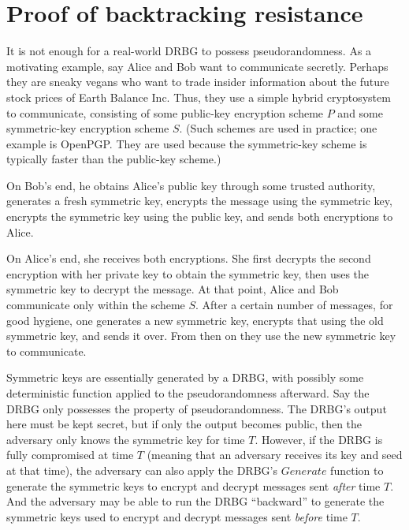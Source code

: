 \documentclass[12pt,lot, lof]{puthesis}
\begin{document}
{%



\section{Proof of backtracking resistance}

It is not enough for a real-world DRBG to possess pseudorandomness. As a motivating example, say Alice and Bob want to communicate secretly. Perhaps they are sneaky vegans who want to trade insider information about the future stock prices of Earth Balance Inc. Thus, they use a simple hybrid cryptosystem to communicate, consisting of some public-key encryption scheme $P$ and some symmetric-key encryption scheme $S$. (Such schemes are used in practice; one example is OpenPGP. They are used because the symmetric-key scheme is typically faster than the public-key scheme.)

On Bob's end, he obtains Alice's public key through some trusted authority, generates a fresh symmetric key, encrypts the message using the symmetric key, encrypts the symmetric key using the public key, and sends both encryptions to Alice.

On Alice's end, she receives both encryptions. She first decrypts the second encryption with her private key to obtain the symmetric key, then uses the symmetric key to decrypt the message. At that point, Alice and Bob communicate only within the scheme $S$. After a certain number of messages, for good hygiene, one generates a new symmetric key, encrypts that using the old symmetric key, and sends it over. From then on they use the new symmetric key to communicate.

Symmetric keys are essentially generated by a DRBG, with possibly some deterministic function applied to the pseudorandomness afterward. Say the DRBG only possesses the property of pseudorandomness. The DRBG's output here must be kept secret, but if only the output becomes public, then the adversary only knows the symmetric key for time $T$. However, if the DRBG is fully compromised at time $T$ (meaning that an adversary receives its key and seed at that time), the adversary can also apply the DRBG's $Generate$ function to generate the symmetric keys to encrypt and decrypt messages sent \emph{after} time $T$. And the adversary may be able to run the DRBG ``backward'' to generate the symmetric keys used to encrypt and decrypt messages sent \emph{before} time $T$.

}
\end{document}
